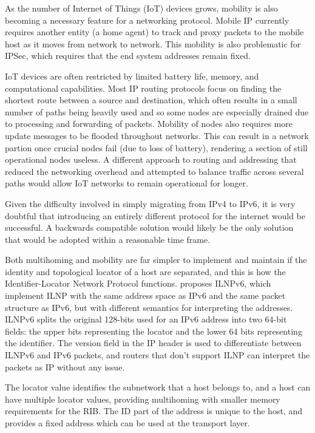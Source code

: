 \documentclass[12pt]{article}
\begin{document}
As the number of Internet of Things (IoT) devices grows, mobility is also becoming a necessary feature for a networking protocol. Mobile IP currently requires another entity (a home agent) to track and proxy packets to the mobile host as it moves from network to network. This mobility is also problematic for IPSec, which requires that the end system addresses remain fixed.

IoT devices are often restricted by limited battery life, memory, and computational capabilities. Most IP routing protocols focus on finding the shortest route between a source and destination, which often results in a small number of paths being heavily used and so some nodes are especially drained due to processing and forwarding of packets. Mobility of nodes also requires more update messages to be flooded throughout networks. This can result in a network partion once crucial nodes fail (due to loss of battery), rendering a section of still operational nodes useless. A different approach to routing and addressing that reduced the networking overhead and attempted to balance traffic across several paths would allow IoT networks to remain operational for longer. 

Given the difficulty involved in simply migrating from IPv4 to IPv6, it is very doubtful that introducing an entirely different protocol for the internet would be successful. A backwards compatible solution would likely be the only solution that would be adopted within a reasonable time frame.

Both multihoming and mobility are far simpler to implement and maintain if the identity and topological locator of a host are separated, and this is how the Identifier-Locator Network Protocol functions. \cite{5586444} proposes ILNPv6, which implement ILNP with the same address space as IPv6 and the same packet structure as IPv6, but with different semantics for interpreting the addresses. ILNPv6 splits the original 128-bits used for an IPv6 address into two 64-bit fields: the upper bits representing the locator and the lower 64 bits representing the identifier. The version field in the IP header is used to differentiate between ILNPv6 and IPv6 packets, and routers that don't support ILNP can interpret the packets as IP without any issue. 

The locator value identifies the subnetwork that a host belongs to, and a host can have multiple locator values, providing multihoming with smaller memory requirements for the RIB. The ID part of the address is unique to the host, and provides a fixed address which can be used at the transport layer.
\end{document}
